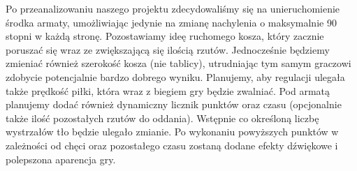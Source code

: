 \documentclass{article}
\begin{document}
\smallskip
\large Po przeanalizowaniu naszego projektu zdecydowaliśmy się na unieruchomienie środka armaty, umożliwiając jedynie na zmianę nachylenia o maksymalnie 90 stopni w każdą stronę. Pozostawiamy ideę ruchomego kosza, który zacznie poruszać się wraz ze zwiększającą się ilością rzutów. Jednocześnie będziemy zmieniać również szerokość kosza (nie tablicy), utrudniając tym samym graczowi zdobycie potencjalnie bardzo dobrego wyniku. Planujemy, aby regulacji ulegała także prędkość piłki, która wraz z biegiem gry będzie zwalniać. Pod armatą planujemy dodać również dynamiczny licznik punktów oraz czasu (opcjonalnie także ilość pozostałych rzutów do oddania). Wstępnie co określoną liczbę wystrzałów tło będzie ulegało zmianie. Po wykonaniu powyższych punktów w zależności od chęci oraz pozostałego czasu zostaną dodane efekty dźwiękowe i polepszona aparencja gry.  \\
\end{document}
